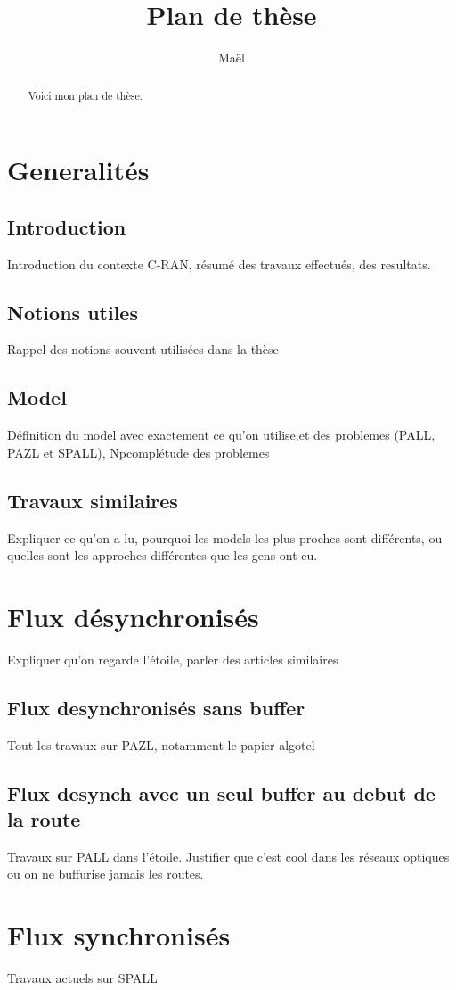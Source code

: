 \documentclass[a4paper,10pt]{article}
\title{Plan de thèse}
\author{Maël}
\begin{document}
\maketitle

\begin{abstract}
Voici mon plan de thèse.
\end{abstract}

\section{Generalités}
\subsection{Introduction}
Introduction du contexte C-RAN, résumé des travaux effectués, des resultats.
\subsection{Notions utiles}
Rappel des notions souvent utilisées dans la thèse
\subsection{Model}
Définition du model avec exactement ce qu'on utilise,et des problemes (PALL, PAZL et SPALL), Npcomplétude des problemes
\subsection{Travaux similaires}
Expliquer ce qu'on a lu, pourquoi les models les plus proches sont différents, ou quelles sont les approches différentes que les gens ont eu.
\section{Flux désynchronisés}
Expliquer qu'on regarde l'étoile, parler des articles similaires
\subsection{Flux desynchronisés sans buffer}
Tout les travaux sur PAZL, notamment le papier algotel
\subsection{Flux desynch avec un seul buffer au debut de la route}
Travaux sur PALL dans l'étoile. Justifier que c'est cool dans les réseaux optiques ou on ne buffurise jamais les routes.
\section{Flux synchronisés}
Travaux actuels sur SPALL
\end{document}
